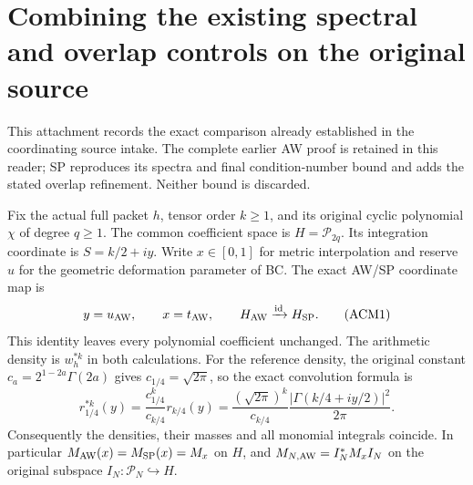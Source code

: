 \section{Combining the existing spectral and overlap controls on the original source}
\label{sec:ACM}
This attachment records the exact comparison already established in the
coordinating source intake. The complete earlier AW proof is retained in
this reader; SP reproduces its spectra and final condition-number bound
and adds the stated overlap refinement. Neither bound is discarded.

Fix the actual full packet $h$, tensor order $k\ge1$, and its original
cyclic polynomial $\chi$ of degree $q\ge1$. The common coefficient space
is $H=\mathcal P_{2q}$. Its integration coordinate is $S=k/2+iy$.
Write $x\in[0,1]$ for metric interpolation and reserve $u$ for the
geometric deformation parameter of BC. The exact AW/SP coordinate map is
\[
 y=u_{\rm AW},\qquad x=t_{\rm AW},\qquad
 H_{\rm AW}\xrightarrow{\operatorname{id}}H_{\rm SP}.
 \tag{ACM1}
\]
This identity leaves every polynomial coefficient unchanged. The
arithmetic density is $w_h^{*k}$ in both calculations. For the reference
density, the original constant $c_a=2^{1-2a}\Gamma(2a)$ gives
$c_{1/4}=\sqrt{2\pi}$, so the exact convolution formula is
\[
 r_{1/4}^{*k}(y)=\frac{c_{1/4}^k}{c_{k/4}}r_{k/4}(y)
 =\frac{(\sqrt{2\pi})^k}{c_{k/4}}
       \frac{|\Gamma(k/4+iy/2)|^2}{2\pi}.
 \tag{ACM2}
\]
Consequently the densities, their masses and all monomial integrals
coincide. In particular $M_{\rm AW}(x)=M_{\rm SP}(x)=M_x$ on $H$,
and $M_{N,\rm AW}=I_N^*M_xI_N$ on the original subspace
$I_N:\mathcal P_N\hookrightarrow H$.


